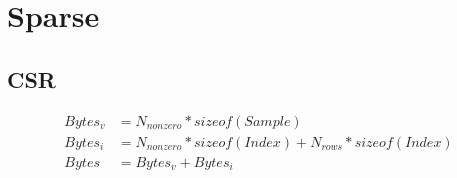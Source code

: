 \documentclass[oneside]{report}
\begin{document}
\section{Sparse}

\subsection{CSR}

\begin{equation}
    \begin{split}
        Bytes_{v} & = N_{nonzero} * sizeof(Sample) \\
        Bytes_{i} & = N_{nonzero} * sizeof(Index) + N_{rows} * sizeof(Index) \\
        Bytes     & = Bytes_{v} + Bytes_{i} \\
    \end{split}
\end{equation}

\newpage


\end{document}

